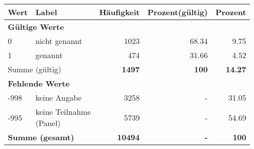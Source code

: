      \begin{longtable}{lXrrr}
     \toprule
     \textbf{Wert} & \textbf{Label} & \textbf{Häufigkeit} & \textbf{Prozent(gültig)} & \textbf{Prozent} \\
     \endhead
     \midrule
     \multicolumn{5}{l}{\textbf{Gültige Werte}}\\

     0 &
     \multicolumn{1}{X}{ nicht genannt   } &


       \num{1023} &
       \num[round-mode=places,round-precision=2]{68,34} &
         \num[round-mode=places,round-precision=2]{9,75} \\

     1 &
     \multicolumn{1}{X}{ genannt   } &


       \num{474} &
       \num[round-mode=places,round-precision=2]{31,66} &
         \num[round-mode=places,round-precision=2]{4,52} \\
     \midrule
     \multicolumn{2}{l}{Summe (gültig)} &
       \textbf{\num{1497}} &
     \textbf{100} &
       \textbf{\num[round-mode=places,round-precision=2]{14,27}} \\
     \multicolumn{5}{l}{\textbf{Fehlende Werte}}\\
       -998 &
       keine Angabe &
         \num{3258} &
        - &
         \num[round-mode=places,round-precision=2]{31,05} \\
       -995 &
       keine Teilnahme (Panel) &
         \num{5739} &
        - &
         \num[round-mode=places,round-precision=2]{54,69} \\
     \midrule
     \multicolumn{2}{l}{\textbf{Summe (gesamt)}} &
          \textbf{\num{10494}} &
        \textbf{-} &
        \textbf{100} \\
     \bottomrule
     \end{longtable}
     

